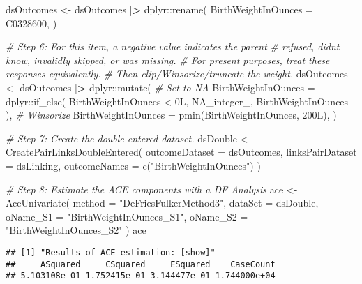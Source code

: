 \documentclass[smallextended]{svjour3}       %
\newenvironment{Shaded}{\begin{snugshade}}{\end{snugshade}}
\newcommand{\AttributeTok}[1]{\textcolor[rgb]{0.77,0.63,0.00}{#1}}
\newcommand{\CommentTok}[1]{\textcolor[rgb]{0.56,0.35,0.01}{\textit{#1}}}
\newcommand{\ConstantTok}[1]{\textcolor[rgb]{0.00,0.00,0.00}{#1}}
\newcommand{\ErrorTok}[1]{\textcolor[rgb]{0.64,0.00,0.00}{\textbf{#1}}}
\newcommand{\FunctionTok}[1]{\textcolor[rgb]{0.00,0.00,0.00}{#1}}
\newcommand{\NormalTok}[1]{#1}
\newcommand{\OtherTok}[1]{\textcolor[rgb]{0.56,0.35,0.01}{#1}}
\newcommand{\SpecialCharTok}[1]{\textcolor[rgb]{0.00,0.00,0.00}{#1}}
\newcommand{\StringTok}[1]{\textcolor[rgb]{0.31,0.60,0.02}{#1}}
\begin{document}
\begin{Shaded}
\begin{Highlighting}[]
\NormalTok{dsOutcomes }\OtherTok{\textless{}{-}} 
\NormalTok{  dsOutcomes }\SpecialCharTok{|}\ErrorTok{\textgreater{}} 
\NormalTok{  dplyr}\SpecialCharTok{::}\FunctionTok{rename}\NormalTok{(}
    \AttributeTok{BirthWeightInOunces =}\NormalTok{ C0328600, }
\NormalTok{  )}

\CommentTok{\# Step 6: For this item, a negative value indicates the parent }
\CommentTok{\#   refused, didn\textquotesingle{}t know, invalidly skipped, or was missing.}
\CommentTok{\#   For present purposes, treat these responses equivalently.}
\CommentTok{\#   Then clip/Winsorize/truncate the weight.}
\NormalTok{dsOutcomes }\OtherTok{\textless{}{-}}
\NormalTok{  dsOutcomes }\SpecialCharTok{|}\ErrorTok{\textgreater{}} 
\NormalTok{  dplyr}\SpecialCharTok{::}\FunctionTok{mutate}\NormalTok{(}
    \CommentTok{\# Set to NA}
    \AttributeTok{BirthWeightInOunces =}\NormalTok{ dplyr}\SpecialCharTok{::}\FunctionTok{if\_else}\NormalTok{(}
\NormalTok{      BirthWeightInOunces }\SpecialCharTok{\textless{}}\NormalTok{ 0L,}
      \ConstantTok{NA\_integer\_}\NormalTok{,}
\NormalTok{      BirthWeightInOunces}
\NormalTok{    ),}
    \CommentTok{\# Winsorize}
    \AttributeTok{BirthWeightInOunces =} \FunctionTok{pmin}\NormalTok{(BirthWeightInOunces, 200L),}
\NormalTok{  )}


\CommentTok{\# Step 7: Create the double entered dataset.}
\NormalTok{dsDouble }\OtherTok{\textless{}{-}} 
  \FunctionTok{CreatePairLinksDoubleEntered}\NormalTok{(}
    \AttributeTok{outcomeDataset   =}\NormalTok{ dsOutcomes,}
    \AttributeTok{linksPairDataset =}\NormalTok{ dsLinking,}
    \AttributeTok{outcomeNames     =} \FunctionTok{c}\NormalTok{(}\StringTok{"BirthWeightInOunces"}\NormalTok{)}
\NormalTok{  )}

\CommentTok{\# Step 8: Estimate the ACE components with a DF Analysis}
\NormalTok{ace }\OtherTok{\textless{}{-}} 
  \FunctionTok{AceUnivariate}\NormalTok{(}
    \AttributeTok{method   =} \StringTok{"DeFriesFulkerMethod3"}\NormalTok{,}
    \AttributeTok{dataSet  =}\NormalTok{ dsDouble,}
    \AttributeTok{oName\_S1 =} \StringTok{"BirthWeightInOunces\_S1"}\NormalTok{,}
    \AttributeTok{oName\_S2 =} \StringTok{"BirthWeightInOunces\_S2"}
\NormalTok{  )}
\NormalTok{ace}
\end{Highlighting}
\end{Shaded}

\begin{verbatim}
## [1] "Results of ACE estimation: [show]"
##     ASquared     CSquared     ESquared    CaseCount 
## 5.103108e-01 1.752415e-01 3.144477e-01 1.744000e+04
\end{verbatim}
\end{document}
